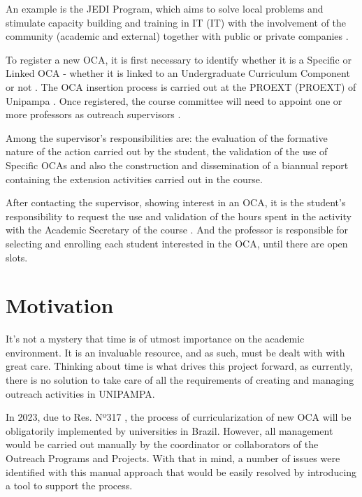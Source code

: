 An example is the JEDI Program, which aims to solve local problems and stimulate capacity building and training in \acl{IT} (\ac{IT}) with the involvement of the community (academic and external) together with public or private companies \cite{chamadaJedi}.

To register a new \acl{OCA}, it is first necessary to identify whether it is a Specific or Linked \ac{OCA} - whether it is linked to an Undergraduate Curriculum Component or not \cite{res317}. The \ac{OCA} insertion process is carried out at the \acl{PROEXT} (\ac{PROEXT}) of Unipampa \cite{res317}. Once registered, the course committee will need to appoint one or more professors as outreach supervisors \cite{res317}.

Among the supervisor's responsibilities are: the evaluation of the formative nature of the action carried out by the student, the validation of the use of Specific \acp{OCA} and also the construction and dissemination of a biannual report containing the extension activities carried out in the course.

After contacting the supervisor, showing interest in an \ac{OCA}, it is the student's responsibility to request the use and validation of the hours spent in the activity with the Academic Secretary of the course \cite{res317}. And the professor is responsible for selecting and enrolling each student interested in the \ac{OCA}, until there are open slots.

\section{Motivation}\label{sec:motivation}

It's not a mystery that time is of utmost importance on the academic environment. It is an invaluable resource, and as such, must be dealt with with great care. Thinking about time is what drives this project forward, as currently, there is no solution to take care of all the requirements of creating and managing outreach activities in \ac{UNIPAMPA}.

In 2023, due to Res. Nº317 \cite{res317}, the process of curricularization of new \acl{OCA} will be obligatorily implemented by universities in Brazil. However, all management would be carried out manually by the coordinator or collaborators of the Outreach Programs and Projects. With that in mind, a number of issues were identified with this manual approach that would be easily resolved by introducing a tool to support the process.

